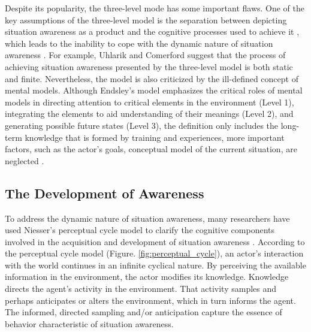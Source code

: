 Despite its popularity, the three-level mode has some important flaws. One of the key assumptions of the three-level model is the separation between depicting situation awareness as a product and the cognitive processes used to achieve it \cite{Salmon2008}, which leads to the inability to cope with the dynamic nature of situation awareness \cite{Smith1995}. For example, Uhlarik and Comerford \cite{uhlarik2002review} suggest that the process of achieving situation awareness presented by the three-level model is both static and finite. Nevertheless, the model is also criticized by the ill-defined concept of mental models. Although Endsley's model emphasizes the critical roles of mental models in directing attention to critical elements in the environment (Level 1), integrating the elements to aid understanding of their meanings (Level 2), and generating possible future states (Level 3), the definition only includes the long-term knowledge that is formed by training and experiences, more important factors, such as the actor's goals, conceptual model of the current situation, are neglected \cite{Bedny1999}.

\subsection{The Development of Awareness} %
\label{sub:awareness_as_process}
To address the dynamic nature of situation awareness, many researchers have used Niesser's perceptual cycle model \cite{neisser1976cognition} to clarify the cognitive components involved in the acquisition and development of situation awareness \cite{Smith1995,Adams1995,Gutwin2002,Stanton2009}. According to the perceptual cycle model (Figure. \ref{fig:perceptual_cycle}), an actor's interaction with the world continues in an infinite cyclical nature. By perceiving the available information in the environment, the actor modifies its knowledge. Knowledge directs the agent's activity in the environment. That activity samples and perhaps anticipates or alters the environment, which in turn informs the agent. The informed, directed sampling and/or anticipation capture the essence of behavior characteristic of situation awareness.


